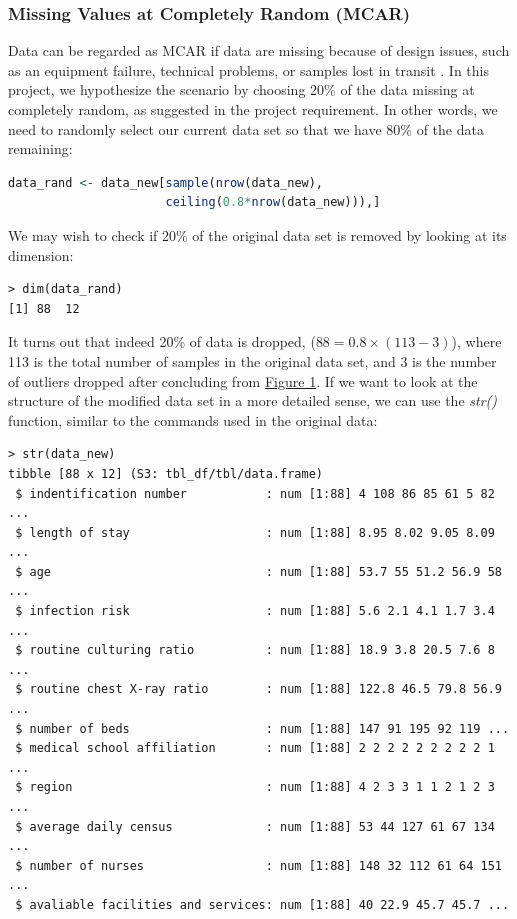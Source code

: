 \documentclass[11pt]{article}
\begin{document}
\subsubsection{Missing Values at Completely Random (MCAR)}\label{sec:2.2.1}
Data can be regarded as MCAR if data are missing because of design issues, such as an equipment failure, technical problems, or samples lost in transit \cite{ar:kang}. In this project, we hypothesize the scenario by choosing 20\% of the data missing at completely random, as suggested in the project requirement. In other words, we need to randomly select our current data set so that we have 80\% of the data remaining:
\begin{file}[hospital.r]
\begin{lstlisting}[language = R] 
data_rand <- data_new[sample(nrow(data_new), 
                      ceiling(0.8*nrow(data_new))),]
\end{lstlisting}
\end{file}
We may wish to check if 20\% of the original data set is removed by looking at its dimension:

\begin{commandline}
\begin{verbatim}
> dim(data_rand)
[1] 88  12
\end{verbatim}
\end{commandline}
It turns out that indeed 20\% of data is dropped, ($88=0.8\times(113-3)$), where 113 is the total number of samples in the original data set, and 3 is the number of outliers dropped after concluding from \hyperref[boxplot]{Figure 1}. If we want to look at the structure of the modified data set in a more detailed sense, we can use the \textit{str()} function, similar to the commands used in the original data:
\begin{commandline}
\begin{verbatim}
> str(data_new)
tibble [88 x 12] (S3: tbl_df/tbl/data.frame)
 $ indentification number           : num [1:88] 4 108 86 85 61 5 82 ...
 $ length of stay                   : num [1:88] 8.95 8.02 9.05 8.09 ...
 $ age                              : num [1:88] 53.7 55 51.2 56.9 58 ...
 $ infection risk                   : num [1:88] 5.6 2.1 4.1 1.7 3.4 ...
 $ routine culturing ratio          : num [1:88] 18.9 3.8 20.5 7.6 8 ...
 $ routine chest X-ray ratio        : num [1:88] 122.8 46.5 79.8 56.9 ...
 $ number of beds                   : num [1:88] 147 91 195 92 119 ...
 $ medical school affiliation       : num [1:88] 2 2 2 2 2 2 2 2 2 1 ...
 $ region                           : num [1:88] 4 2 3 3 1 1 2 1 2 3 ...
 $ average daily census             : num [1:88] 53 44 127 61 67 134 ...
 $ number of nurses                 : num [1:88] 148 32 112 61 64 151 ...
 $ avaliable facilities and services: num [1:88] 40 22.9 45.7 45.7 ...
\end{verbatim}
\end{commandline}
\end{document}
